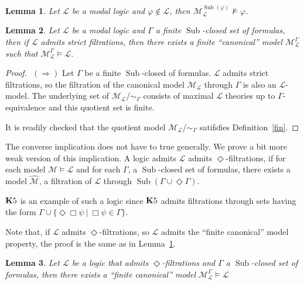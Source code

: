 \documentclass[a4paper]{article}
\theoremstyle{defin}
\theoremstyle{theorem}
\theoremstyle{prop}
\theoremstyle{lemma}
\newtheorem{lemma}{Lemma}
\theoremstyle{fact}
\theoremstyle{ex}
\theoremstyle{col}
\begin{document}
\begin{lemma}\label{good}
  Let $\mathcal{L}$ be a modal logic and $\varphi \not\in \mathcal{L}$, then $\mathcal{M}_{\mathcal{L}}^{\operatorname{Sub}(\varphi)} \nvDash \varphi$.
\end{lemma}

\begin{lemma} Let $\mathcal{L}$ be a modal logic and $\Gamma$ a finite $\operatorname{Sub}$-closed set of formulas, then if $\mathcal{L}$ admits strict filtrations, then there exists a finite ``canonical'' model $\mathcal{M}_{\mathcal{L}}^{\Gamma}$ such that $\mathcal{M}_{\mathcal{L}}^{\Gamma} \models \mathcal{L}$.
\end{lemma}

\begin{proof}
  $ $
$(\Rightarrow)$
  Let $\Gamma$ be a finite $\operatorname{Sub}$-closed of formulas. $\mathcal{L}$ admits strict filtrations, so the filtration of the canonical model $\mathcal{M}_{\mathcal{L}}$ through $\Gamma$ is also an $\mathcal{L}$-model. The underlying set of $\mathcal{M}_{\mathcal{L}} / \sim_{\Gamma}$ consists of maximal $\mathcal{L}$ theories up to $\Gamma$-equivalence and this quotient set is finite.

  It is readily checked that the quotient model $\mathcal{M}_{\mathcal{L}} / \sim_{\Gamma}$ satifsfies Definition~\ref{fin}.
\end{proof}

The converse implication does not have to true generally. We prove a bit more weak version of this implication. A logic admits $\mathcal{L}$ admits $\Diamond$-filtrations, if for each model $\mathcal{M} \models \mathcal{L}$ and for each $\Gamma$, a $\operatorname{Sub}$-closed set of formulas, there exists a model $\widehat{\mathcal{M}}$, a filtration of $\mathcal{L}$ through $\operatorname{Sub}(\Gamma \cup \Diamond \Gamma)$.

${\bf K}5$ is an example of such a logic since ${\bf K}5$ admits filtrations through sets having the form $\Gamma \cup \{ \Diamond \Box \psi \: | \: \Box \psi \in \Gamma \}$.

Note that, if $\mathcal{L}$ admits $\Diamond$-filtrations, so $\mathcal{L}$ admits the ``finite canonical'' model property, the proof is the same as in Lemma~\ref{good}.

\begin{lemma}
  Let $\mathcal{L}$ be a logic that admits $\Diamond$-filtrations and $\Gamma$ a $\operatorname{Sub}$-closed set of formulas, then there exists a ``finite canonical'' model $\mathcal{M}^{\Gamma}_{\mathcal{L}} \models \mathcal{L}$
\end{lemma}
\end{document}
